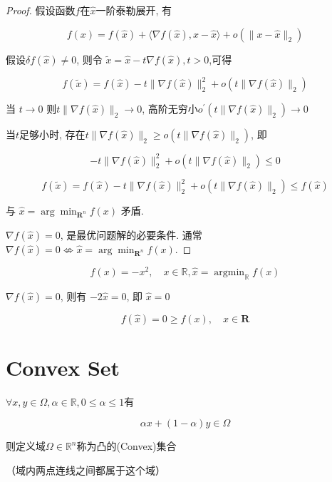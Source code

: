 \begin{proof}
    假设函数$f$在$\hat{x}$一阶泰勒展开, 有

    $$ f(x)=f(\hat{x})+\langle\nabla f(\hat{x}), x-\hat{x}\rangle+o\left(\|x-\hat{x}\|_{2}\right) $$

    假设$ \delta f(\hat{x}) \neq 0 $, 则令 $ \tilde{x}=\hat{x}-t \nabla f(\hat{x}), t>0 $,可得

    $$ f(\tilde{x})=f(\hat{x})-t\|\nabla f(\hat{x})\|_{2}^{2}+o\left(t\|\nabla f(\hat{x})\|_{2}\right) $$

    当 $ t \rightarrow 0 $ 则$ t\|\nabla f(\hat{x})\|_{2} \rightarrow 0 $,  高阶无穷小$ {o }^{\prime}\left(t\|\nabla f(\hat{x})\|_{2}\right) \rightarrow 0 $

    当$t$足够小时, 存在$ t\|\nabla f(\hat{x})\|_{2} \geq o\left(t\|\nabla f(\hat{x})\|_{2}\right) $, 即

    $$ -t\|\nabla f(\hat{x})\|_{2}^{2}+o\left(t\|\nabla f(\hat{x})\|_{2}\right) \leq 0 $$

    $$ f(\tilde{x})=f(\hat{x})-t\|\nabla f(\hat{x})\|_{2}^{2}+o\left(t\|\nabla f(\hat{x})\|_{2}\right) \leq f(\hat{x}) $$

    与 $ \hat{x}=\arg \min _{\mathbf{R}^{n}} f(x) $ 矛盾. 

    $ \nabla f(\widehat{x})=0 $, 是最优问题解的必要条件. 通常 $ \nabla f(\hat{x})=0 \not \Leftrightarrow \hat{x}=\arg \min _{\mathbf{R}^{n}} f(x) $. 
\end{proof}

\begin{example}
    $$ f(x)=-x^{2}, \quad x \in \mathbb{R}, \hat{x}=\operatorname{argmin}_{\mathbb{R}} f(x) $$

    $ \nabla f(\hat{x})=0 $, 则有 $ -2 \hat{x}=0 $, 即 $ \hat{x}=0 $

    $$ f(\hat{x})=0 \geq f(x), \quad x \in \mathbf{R} $$


\end{example}

\section{Convex Set}

\begin{definition}[凸集]
    $ \forall x, y \in \Omega, \alpha \in \mathbb{R}, 0 \leq \alpha \leq 1 $有

    $$ \alpha x+(1-\alpha) y \in \Omega $$

    则定义域$ \Omega \in \mathbb{R}^{n} $称为凸的(Convex)集合

    （域内两点连线之间都属于这个域）
\end{definition}

